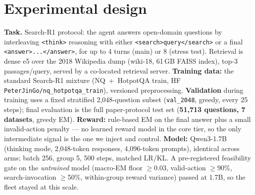 \documentclass[11pt,a4paper]{article}
\begin{document}
\section{Experimental design}

\textbf{Task.} Search-R1 protocol: the agent answers open-domain questions by interleaving
\texttt{<think>} reasoning with either \texttt{<search>query</search>} or a final
\texttt{<answer>...</answer>}, for up to 4 turns (main) or 8 (stress test). Retrieval is dense e5
over the 2018 Wikipedia dump (wiki-18, 61\,GB FAISS index), top-3 passages/query, served by a
co-located retrieval server. \textbf{Training data:} the standard Search-R1 mixture (NQ~+~HotpotQA
train, HF \texttt{PeterJinGo/nq\_hotpotqa\_train}), versioned preprocessing. \textbf{Validation}
during training uses a fixed stratified 2{,}048-question subset (\texttt{val\_2048}, greedy, every
25 steps); final evaluation is the full paper-protocol test set (\textbf{51{,}713 questions, 7
datasets}, greedy EM). \textbf{Reward:} rule-based EM on the final answer plus a small
invalid-action penalty --- no learned reward model in the core tier, so the only intermediate
signal is the one we inject and control. \textbf{Model:} Qwen3-1.7B (thinking mode, 2{,}048-token
responses, 4{,}096-token prompts), identical across arms; batch 256, group 5, 500 steps, matched
LR/KL. A pre-registered feasibility gate on the \emph{untrained} model (macro-EM floor $\geq$0.03,
valid-action $\geq$90\%, search-invocation $\geq$50\%, within-group reward variance) passed at
1.7B, so the fleet stayed at this scale.
\end{document}
